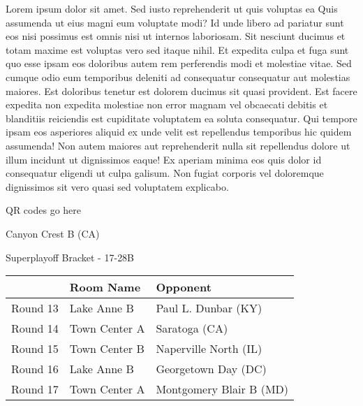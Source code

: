 \documentclass{article}%
\begin{document}
\vspace*{8pt}%
\linebreak%
\newline%
\newline%
Lorem ipsum dolor sit amet. Sed iusto reprehenderit ut quis voluptas ea Quis assumenda ut eius magni eum voluptate modi? Id unde libero ad pariatur sunt eos nisi possimus est omnis nisi ut internos laboriosam. Sit nesciunt ducimus et totam maxime est voluptas vero sed itaque nihil. Et expedita culpa et fuga sunt quo esse ipsam eos doloribus autem rem perferendis modi et molestiae vitae.\newline%
\newline%
Sed cumque odio eum temporibus deleniti ad consequatur consequatur aut molestias maiores. Est doloribus tenetur est dolorem ducimus sit quasi provident. Est facere expedita non expedita molestiae non error magnam vel obcaecati debitis et blanditiis reiciendis est cupiditate voluptatem ea soluta consequatur. Qui tempore ipsam eos asperiores aliquid ex unde velit est repellendus temporibus hic quidem assumenda!\newline%
\newline%
Non autem maiores aut reprehenderit nulla sit repellendus dolore ut illum incidunt ut dignissimos eaque! Ex aperiam minima eos quis dolor id consequatur eligendi ut culpa galisum. Non fugiat corporis vel doloremque dignissimos sit vero quasi sed voluptatem explicabo.\newline%
\newline%
%
\vspace*{30pt}%
\begin{center}%
\begin{Huge}%
QR codes go here%
\end{Huge}%
\end{center}%
\newpage%
\begin{center}%
\begin{Huge}%
Canyon Crest B (CA)%
\end{Huge}%
\vspace*{8pt}%
\linebreak%
\begin{Large}%
Superplayoff Bracket {-} 17{-}28B%
\end{Large}%
\end{center}%
%
\begin{tabularx}{\textwidth}{|c|Y|Y|}%
\hline%
&Room Name&Opponent\\%
\hline%
Round 13&Lake Anne B&Paul L. Dunbar (KY)\\%
Round 14&Town Center A&Saratoga (CA)\\%
Round 15&Town Center B&Naperville North (IL)\\%
Round 16&Lake Anne B&Georgetown Day (DC)\\%
Round 17&Town Center A&Montgomery Blair B (MD)\\%
\hline%
\end{tabularx}%
\end{document}
